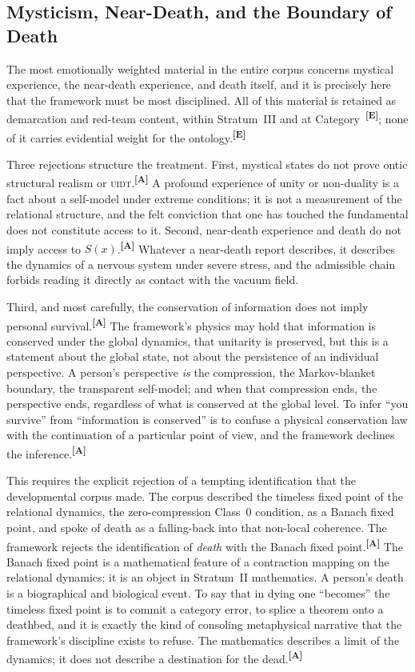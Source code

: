 \documentclass[12pt,a4paper,twoside]{article}
\theoremstyle{plain}
\theoremstyle{definition}
\theoremstyle{remark}
\newcommand{\UIDT}{\textsc{uidt}}
\newcommand{\catmark}[1]{\textsuperscript{\textsf{\textbf{[#1]}}}}
\begin{document}
\subsection{Mysticism, Near-Death, and the Boundary of Death}
\label{subsec:mysticism-nde-death}

The most emotionally weighted material in the entire corpus concerns mystical experience, the near-death experience, and death itself, and it is precisely here that the framework must be most disciplined. All of this material is retained as demarcation and red-team content, within Stratum~III and at Category~\catmark{E}; none of it carries evidential weight for the ontology.\catmark{E}

Three rejections structure the treatment. First, mystical states do not prove ontic structural realism or \UIDT.\catmark{A} A profound experience of unity or non-duality is a fact about a self-model under extreme conditions; it is not a measurement of the relational structure, and the felt conviction that one has touched the fundamental does not constitute access to it. Second, near-death experience and death do not imply access to $S(x)$.\catmark{A} Whatever a near-death report describes, it describes the dynamics of a nervous system under severe stress, and the admissible chain forbids reading it directly as contact with the vacuum field.

Third, and most carefully, the conservation of information does not imply personal survival.\catmark{A} The framework's physics may hold that information is conserved under the global dynamics, that unitarity is preserved, but this is a statement about the global state, not about the persistence of an individual perspective. A person's perspective \emph{is} the compression, the Markov-blanket boundary, the transparent self-model; and when that compression ends, the perspective ends, regardless of what is conserved at the global level. To infer ``you survive'' from ``information is conserved'' is to confuse a physical conservation law with the continuation of a particular point of view, and the framework declines the inference.\catmark{A}

This requires the explicit rejection of a tempting identification that the developmental corpus made. The corpus described the timeless fixed point of the relational dynamics, the zero-compression Class~0 condition, as a Banach fixed point, and spoke of death as a falling-back into that non-local coherence. The framework rejects the identification of \emph{death} with the Banach fixed point.\catmark{A} The Banach fixed point is a mathematical feature of a contraction mapping on the relational dynamics; it is an object in Stratum~II mathematics. A person's death is a biographical and biological event. To say that in dying one ``becomes'' the timeless fixed point is to commit a category error, to splice a theorem onto a deathbed, and it is exactly the kind of consoling metaphysical narrative that the framework's discipline exists to refuse. The mathematics describes a limit of the dynamics; it does not describe a destination for the dead.\catmark{A}
\end{document}
